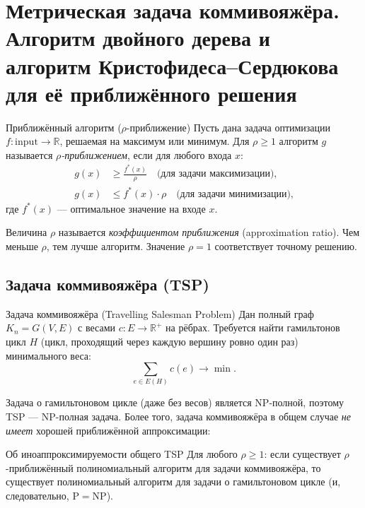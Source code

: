 
\section{Метрическая задача коммивояжёра. Алгоритм двойного дерева и алгоритм Кристофидеса--Сердюкова для её приближённого решения}

\begin{Definition}{Приближённый алгоритм ($\rho$-приближение)}{}
	Пусть дана задача оптимизации $f\colon \mathrm{input} \to \mathbb{R}$, решаемая на максимум или минимум. Для $\rho \geq 1$ алгоритм $g$ называется \emph{$\rho$-приближением}, если для любого входа $x$:
	\begin{align*}
		g(x) &\geq \frac{f^*(x)}{\rho} \quad \text{(для задачи максимизации),} \\
		g(x) &\leq f^*(x) \cdot \rho \quad \text{(для задачи минимизации),}
	\end{align*}
	где $f^*(x)$ --- оптимальное значение на входе $x$.
\end{Definition}

\begin{Remark}{}{}
	Величина $\rho$ называется \emph{коэффициентом приближения} (approximation ratio). Чем меньше $\rho$, тем лучше алгоритм. Значение $\rho = 1$ соответствует точному решению.
\end{Remark}

\subsection{Задача коммивояжёра (TSP)}

\begin{Definition}{Задача коммивояжёра (Travelling Salesman Problem)}{}
	Дан полный граф $K_n = G(V,E)$ с весами $c\colon E \to \mathbb{R}^+$ на рёбрах. Требуется найти гамильтонов цикл $H$ (цикл, проходящий через каждую вершину ровно один раз) минимального веса:
	\[
	\sum_{e \in E(H)} c(e) \to \min.
	\]
\end{Definition}

Задача о гамильтоновом цикле (даже без весов) является NP-полной, поэтому TSP --- NP-полная задача. Более того, задача коммивояжёра в общем случае \emph{не имеет} хорошей приближённой аппроксимации:

\begin{Proposition}{Об иноаппроксимируемости общего TSP}{}
	Для любого $\rho \geq 1$: если существует $\rho$-приближённый полиномиальный алгоритм для задачи коммивояжёра, то существует полиномиальный алгоритм для задачи о гамильтоновом цикле (и, следовательно, $\mathrm{P} = \mathrm{NP}$).
\end{Proposition}

